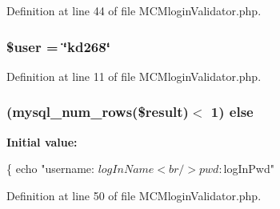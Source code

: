 Definition at line 44 of file M\-C\-Mlogin\-Validator.\-php.

\hypertarget{_m_c_mlogin_validator_8php_a598ca4e71b15a1313ec95f0df1027ca5}{
\subsubsection[{\$user}]{\setlength{\rightskip}{0pt plus 5cm}\$user = \char`\"{}kd268\char`\"{}}}\label{_m_c_mlogin_validator_8php_a598ca4e71b15a1313ec95f0df1027ca5}


Definition at line 11 of file M\-C\-Mlogin\-Validator.\-php.

\hypertarget{_m_c_mlogin_validator_8php_acd73321adf3d3d588369f5341463f6d3}{
\subsubsection[{else}]{ (mysql\-\_\-num\-\_\-rows(\$result)$<$ 1) else}}\label{_m_c_mlogin_validator_8php_acd73321adf3d3d588369f5341463f6d3}
{\bfseries Initial value\-:}
\begin{DoxyCode}
\{
        echo \textcolor{stringliteral}{"username: $logInName <br/> pwd: $logInPwd"}
\end{DoxyCode}


Definition at line 50 of file M\-C\-Mlogin\-Validator.\-php.


